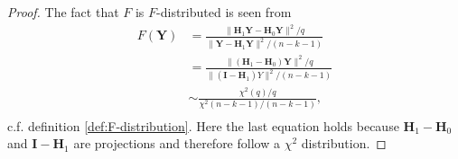 \begin{proof}
    The fact that $F$ is $F$-distributed is seen from
    \begin{align*}
        F(\textbf{Y}) &= \frac{\| \textbf{H}_1 \textbf{Y} - \textbf{H}_0 \textbf{Y} \|^2/q}{\| \textbf{Y} - \textbf{H}_1 \textbf{Y} \|^2/(n-k-1)} \\
        &= \frac{\| (\textbf{H}_1 - \textbf{H}_0) \textbf{Y} \|^2/q}{\| (\textbf{I} - \textbf{H}_1) Y \|^2/(n-k-1)} \\
        &\sim \frac{\chi^2(q)/q}{\chi^2(n-k-1)/(n-k-1)}, \\
    \end{align*}
    c.f.$\!$ definition \ref{def:F-distribution}. Here the last equation holds because $\textbf{H}_1 - \textbf{H}_0$ and $\textbf{I} - \textbf{H}_1$ are projections and therefore follow a $\chi^2$ distribution.
\end{proof}

